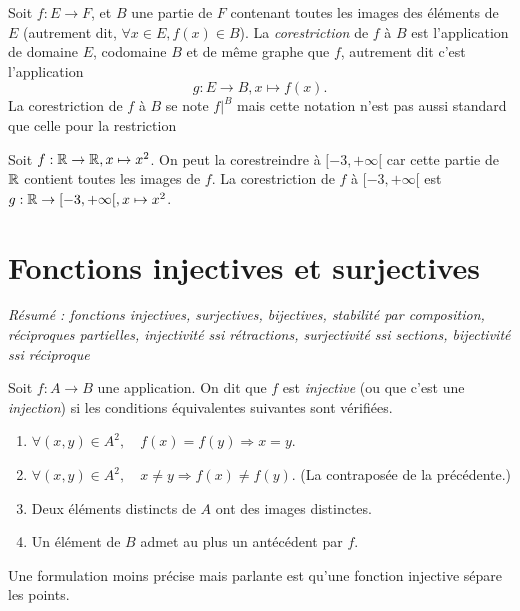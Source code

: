 \begin{definition}[Corestriction]\label{def-corestriction}
Soit $f : E\to F$, et $B$ une partie de $F$ contenant toutes les images des éléments de $E$ (autrement dit, $\forall x\in E, f(x)\in B$).
La \emph{corestriction} de $f$ à $B$ est l'application de domaine $E$, codomaine $B$ et de même graphe que $f$, autrement dit c'est l'application 
\[ g : E\to B, x\mapsto f(x).\]
La corestriction de $f$ à $B$ se note $f|^{B}$ mais cette notation n'est pas aussi standard que celle pour la restriction
\end{definition}

\begin{exemple}
Soit $f : \mathbb{R}\to \mathbb{R}, x\mapsto x^2$. On peut la corestreindre à $[-3,+\infty[$ car cette partie de $\mathbb{R}$ contient toutes les images de $f$. La corestriction de $f$ à $[-3,+\infty[$ est $g : \mathbb{R}\to [-3,+\infty[, x\mapsto x^2$.
\end{exemple}





\section{Fonctions injectives et surjectives}

\emph{Résumé : fonctions injectives, surjectives, bijectives, stabilité par composition, réciproques partielles, injectivité ssi rétractions, surjectivité ssi  sections, bijectivité ssi réciproque}



\begin{definition}
Soit $f : A \to B$ une application. On dit que $f$ est \emph{injective} (ou que c'est une \emph{injection}) si les conditions équivalentes suivantes sont vérifiées.
\begin{enumerate}
\item $\forall (x,y) \in A^2,\quad f(x)=f(y) \Rightarrow  x=y$.
\item $\forall (x,y) \in A^2,\quad x\neq y \Rightarrow  f(x)\neq f(y)$. (La contraposée de la précédente.)
\item Deux éléments distincts de $A$ ont des images distinctes. 
\item Un élément de $B$ admet au plus un antécédent par $f$.
\end{enumerate}
Une formulation moins précise mais parlante est qu'une fonction injective \og sépare les points\fg{}.
\end{definition}

